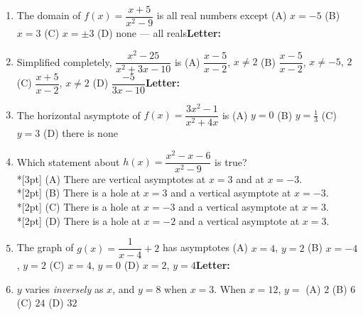 \documentclass[10pt]{article}
\begin{document}
\begin{enumerate}[leftmargin=1.9em, itemsep=9pt]
  \item The domain of $f(x)=\dfrac{x+5}{x^2-9}$ is all real numbers except
    \hfill (A) $x=-5$ \quad (B) $x=3$ \quad (C) $x=\pm 3$ \quad (D) none --- all reals\nobreak\hfill\mbox{\small\textbf{Letter:}\ \choicebox{\gradedblank[id=qb1, type=choice, points=2, answer={C}]{0.4in}{10pt}}}
  \item Simplified completely, $\dfrac{x^2-25}{x^2+3x-10}$ is
    \hfill (A) $\dfrac{x-5}{x-2}$, $x\ne 2$ \quad (B) $\dfrac{x-5}{x-2}$, $x\ne -5,\,2$ \quad (C) $\dfrac{x+5}{x-2}$, $x\ne 2$ \quad (D) $\dfrac{-5}{3x-10}$\nobreak\hfill\mbox{\small\textbf{Letter:}\ \choicebox{\gradedblank[id=qb2, type=choice, points=2, answer={B}]{0.4in}{10pt}}}
  \item The horizontal asymptote of $f(x)=\dfrac{3x^2-1}{x^2+4x}$ is
    \hfill \llap{\choicebox{\gradedblank[id=qb3, type=choice, points=2, answer={C}]{0.2in}{10pt}}\,}(A) $y=0$ \quad (B) $y=\frac13$ \quad (C) $y=3$ \quad (D) there is none
  \item {}Which statement about $h(x)=\dfrac{x^2-x-6}{x^2-9}$ is true?
    \\*[3pt]\hspace*{1.2em} (A) There are vertical asymptotes at $x=3$ and at $x=-3$.
    \\*[2pt]\hspace*{1.2em} (B) There is a hole at $x=3$ and a vertical asymptote at $x=-3$.
    \\*[2pt]\hspace*{1.2em} (C) There is a hole at $x=-3$ and a vertical asymptote at $x=3$.
    \\*[2pt]\hspace*{1.2em} (D) There is a hole at $x=-2$ and a vertical asymptote at $x=3$.
  \item The graph of $g(x)=\dfrac{1}{x-4}+2$ has asymptotes
    \hfill (A) $x=4$, $y=2$ \quad (B) $x=-4$, $y=2$ \quad (C) $x=4$, $y=0$ \quad (D) $x=2$, $y=4$\nobreak\hfill\mbox{\small\textbf{Letter:}\ \choicebox{\gradedblank[id=qb5, type=choice, points=2, answer={A}]{0.4in}{10pt}}}
  \item $y$ varies \emph{inversely} as $x$, and $y=8$ when $x=3$. When $x=12$, $y=$
    \hfill \llap{\choicebox{\gradedblank[id=qb6, type=choice, points=2, answer={A}]{0.35in}{10pt}}\enspace}(A) $2$ \quad (B) $6$ \quad (C) $24$ \quad (D) $32$
\end{enumerate}
\end{document}
